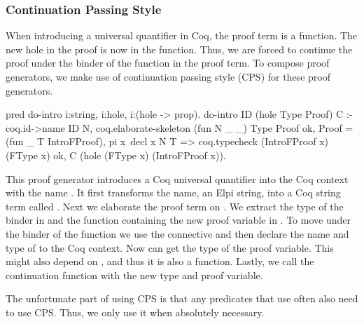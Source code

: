 \documentclass[thesis.tex]{subfiles}
\begin{document}
{{{{\subsubsection{Continuation Passing Style}\label{ssec:cecps}
When introducing a universal quantifier in Coq, the proof term is a function. The new hole in the proof is now in the function. Thus, we are forced to continue the proof under the binder of the function in the proof term. To compose proof generators, we make use of continuation passing style (CPS) for these proof generators.
\begin{elpicode}
  pred do-intro i:string, i:hole, i:(hole -> prop).
  do-intro ID (hole Type Proof) C :-
    coq.id->name ID N,
    coq.elaborate-skeleton (fun N _ _) Type Proof ok,
    Proof = (fun _ T IntroFProof),
    pi x\ decl x N T =>
      coq.typecheck (IntroFProof x) (FType x) ok,
      C (hole (FType x) (IntroFProof x)).
\end{elpicode}
This proof generator introduces a Coq universal quantifier into the Coq context with the name . It first transforms the name, an Elpi string, into a Coq string term called . Next we elaborate the proof term  on . We extract the type of the binder in  and the function containing the new proof variable in . To move under the binder of the function we use the  connective and then declare the name and type of  to the Coq context. Now can get the type of the proof variable. This might also depend on , and thus it is also a function. Lastly, we call the continuation function with the new type and proof variable.

The unfortunate part of using CPS is that any predicates that use  often also need to use CPS. Thus, we only use it when absolutely necessary.

}}}}
\end{document}

